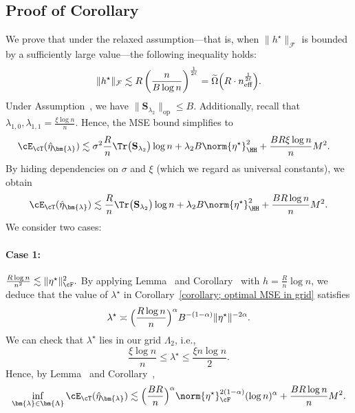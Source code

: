 \documentclass[12pt,a4paper,pdftex,onepage]{article}
\newcommand{\op}{\operatorname{op}}
\newcommand{\sig}{\sigma}
\newcommand{\Sbar}{\mathbf{S}}
\begin{document}
\subsection{Proof of Corollary~}\label{subsection; proof main corollary}
\noindent
We prove that under the relaxed assumption---that is, when 
\(\|h^\star\|_{\mathcal{F}}\) is bounded by a sufficiently large value---the following inequality holds:
\[
\|h^\star\|_{\mathcal{F}} \lesssim R \left(\frac{n}{B \log n}\right)^{\frac{1}{2\ell}} = \widetilde{\Omega}\Bigl(R \cdot n_{\operatorname{eff}}^{\frac{1}{2\ell}}\Bigr).
\]
Under Assumption~, we have \(\|\Sbar_{\lambda_2} \|_{\op} \leq B\).
Additionally, recall that \(\lambda_{1,0}, \lambda_{1,1} = \frac{\xi \log n}{n}\).
Hence, the MSE bound simplifies to
\begin{align*}
\cE_{\cT}(\hat{\eta}_{\bm{\lambda}})
&\lesssim \sig^2\frac{R}{n}\Tr\bigl(\Sbar_{\lambda_2}\bigr)\log n 
+\lambda_2B \norm{\eta^\star}^2_\HH 
+\frac{BR\xi\log n}{n}M^2.
\end{align*}
By hiding dependencies on \(\sigma\) and \(\xi\) (which we regard as universal constants), we obtain
\[
\cE_{\cT}(\hat{\eta}_{\bm{\lambda}})
\lesssim \frac{R}{n}\Tr\bigl(\Sbar_{\lambda_2}\bigr)\log n 
+  \lambda_2 B \norm{\eta^\star}^2_\HH 
+\frac{BR\log n}{n}M^2.
\]
We consider two cases:

\paragraph{Case 1:} \(\frac{R\log n}{n^2}\lesssim\|\eta^\star\|^2_\cF.\)
By applying Lemma~ and Corollary~ with \(h = \frac{R}{n}\log n\), we deduce that the value of \(\lambda^\star\) in Corollary~\ref{corollary; optimal MSE in grid} satisfies
\[
\lambda^\star \asymp \Bigl(\frac{R\log n}{n}\Bigr)^{\alpha}B^{-(1-\alpha)} \|\eta^\star \|^{-2\alpha}.
\]
We can check that $\lambda^\star$ lies in our grid $\Lambda_2$, i.e., 
\[
\frac{\xi \log n}{n} \leq \lambda^\star \leq \frac{\xi n \log n}{2}.
\]
Hence, by Lemma~ and Corollary~,
\[
\inf_{\bm{\lambda} \in \bm{\Lambda}}  \cE_{\cT}(\hat{\eta}_{\bm{\lambda}}) 
\lesssim \Bigl(\frac{BR}{n}\Bigr)^\alpha\norm{\eta^\star}^{2(1-\alpha)}_\cF (\log n)^\alpha 
+\frac{BR\log n}{n}M^2.
\]
\end{document}
